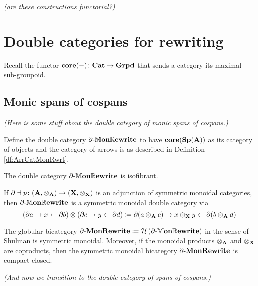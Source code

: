 \documentclass{amsart}
\begin{document}
{\color{red}\emph{(are these constructions functorial?)}}

\section{Double categories for rewriting}

Recall the functor $ \mathbf{core}(-) \colon \mathbf{Cat} \to \mathbf{Grpd} $ that sends a category its maximal sub-groupoid.

\subsection{Monic spans of cospans}

\emph{(Here is some stuff about the double category of monic spans of cospans.)}

\begin{df}
	Define the double category $ \partial \text{-} \mathbb{M}\mathbf{on}\mathbb{R}\mathbf{ewrite} $ to have $ \mathbf{core}( \mathbf{Sp}(\mathbf{A})) $ as its category of objects and the category of arrows is as described in Definition \ref{df:ArrCatMonRwrt}. 
\end{df}

\begin{thm}
	The double category $ \partial \text{-} \mathbb{M}\mathbf{on}\mathbb{R}\mathbf{ewrite} $ is isofibrant.
\end{thm}

\begin{thm}
	If $ \partial \dashv p \colon (\mathbf{A}, \otimes_{\mathbf{A}}) \to (\mathbf{X}, \otimes_{\mathbf{X}}) $ is an adjunction of symmetric monoidal categories, then $ \partial \text{-} \mathbb{M}\mathbf{on}\mathbb{R}\mathbf{ewrite} $ is a symmetric monoidal double category via
	\[
	\left( \partial a \to x \gets \partial b \right) \otimes
	\left( \partial c \to y \gets \partial d	\right) \coloneqq
	\partial (a \otimes_{\mathbf{A}} c) \to 
		x \otimes_{\mathbf{X}} y \gets \partial (b \otimes_{\mathbf{A}} d)
	\]
\end{thm}

\begin{thm}
	The globular bicategory $ \partial \text{-} \mathbf{MonRewrite} \coloneqq  \mathcal{H} \left( \partial \text{-} \mathbb{M}\mathbf{on}\mathbb{R}\mathbf{ewrite} \right) $ in the sense of Shulman is symmetric monoidal.  Moreover, if the monoidal products $ \otimes_{\mathbf{A}} $ and $ \otimes_{\mathbf{X}} $ are coproducts, then the symmetric monoidal bicategory $ \partial \text{-} \mathbf{MonRewrite} $ is compact closed.
\end{thm}

\emph{(And now we transition to the double category of spans of cospans.)}
\end{document}
